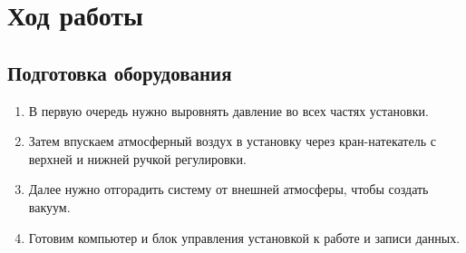 \documentclass[a4paper, 12pt]{article}%
\begin{document}
\section*{Ход работы}
\subsection*{Подготовка оборудования}
\begin{enumerate}
\item В первую очередь нужно выровнять давление во всех частях установки.
\item Затем впускаем атмосферный воздух в установку через кран-натекатель с верхней и нижней ручкой регулировки.
\item Далее нужно отгорадить систему от внешней атмосферы, чтобы создать вакуум.
\item Готовим компьютер и блок управления установкой к работе и записи данных.
\end{enumerate}
\end{document}
